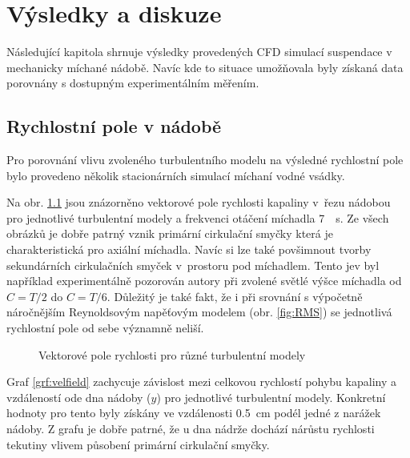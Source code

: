 \chapter{Výsledky a diskuze}
Následující kapitola shrnuje výsledky provedených CFD simulací suspendace v mechanicky míchané nádobě. Navíc kde to situace umožňovala byly získaná data porovnány s dostupným experimentálním měřením.

\section{Rychlostní pole v nádobě}
Pro porovnání vlivu zvoleného turbulentního modelu na výsledné rychlostní pole bylo provedeno několik stacionárních simulací míchaní vodné vsádky. 

Na obr. \ref{fig:velfield} jsou znázorněno vektorové pole rychlosti kapaliny v~řezu nádobou pro jednotlivé turbulentní modely a frekvenci otáčení míchadla \SI{7}{\per\second}. Ze všech obrázků je dobře patrný vznik primární cirkulační smyčky která je charakteristická pro axiální míchadla. Navíc si lze také povšimnout tvorby sekundárních cirkulačních smyček v~prostoru pod míchadlem. Tento jev byl například experimentálně pozorován autory \citet{hos10} při zvolené světlé výšce míchadla od $C=T/2$ do $C=T/6$. Důležitý je také fakt, že i při srovnání s výpočetně náročnějším Reynoldsovým napěťovým modelem (obr. \ref{fig:RMS}) se jednotlivá rychlostní pole od sebe významně neliší.

\begin{figure}[h!]
 \centering

  \qquad 
\end{figure}
\newpage
\begin{figure}[t!]
  \addtocounter{subfigure}{2}
 \centering
  \qquad
  \caption{Vektorové pole rychlosti pro různé turbulentní modely}
  \label{fig:velfield}
\end{figure}

Graf \ref{grf:velfield} zachycuje závislost mezi celkovou rychlostí pohybu kapaliny a vzdáleností ode dna nádoby ($y$) pro jednotlivé turbulentní modely. Konkretní hodnoty pro tento byly získány ve vzdálenosti \SI{0.5}{\centi\meter} podél jedné z narážek nádoby. Z grafu je dobře patrné, že u dna nádrže dochází nárůstu rychlosti tekutiny vlivem působení primární cirkulační smyčky.

